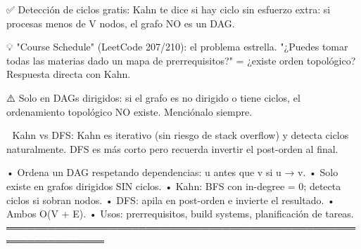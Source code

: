 \begin{dsaentrevistas}

✅ Detección de ciclos gratis: Kahn te dice si hay ciclo sin esfuerzo
   extra: si procesas menos de V nodos, el grafo NO es un DAG.

💡 "Course Schedule" (LeetCode 207/210): el problema estrella. "¿Puedes
   tomar todas las materias dado un mapa de prerrequisitos?" = ¿existe
   orden topológico? Respuesta directa con Kahn.

⚠️ Solo en DAGs dirigidos: si el grafo es no dirigido o tiene ciclos,
   el ordenamiento topológico NO existe. Menciónalo siempre.

🔑 Kahn vs DFS: Kahn es iterativo (sin riesgo de stack overflow) y
   detecta ciclos naturalmente. DFS es más corto pero recuerda invertir
   el post-orden al final.

\end{dsaentrevistas}

\begin{dsaresumen}

• Ordena un DAG respetando dependencias: u antes que v si u → v.
• Solo existe en grafos dirigidos SIN ciclos.
• Kahn: BFS con in-degree = 0; detecta ciclos si sobran nodos.
• DFS: apila en post-orden e invierte el resultado.
• Ambos O(V + E).
• Usos: prerrequisitos, build systems, planificación de tareas.
════════════════════════════════════════════════════════════════

\end{dsaresumen}
